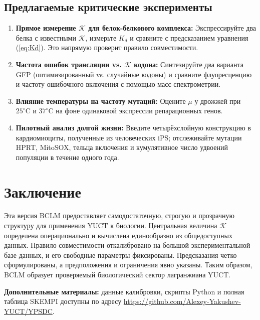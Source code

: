 \documentclass[12pt,a4paper]{article}
\newcommand{\REL}{\mathcal{K}}          %
\begin{document}
	\subsection{Предлагаемые критические эксперименты}
	\begin{enumerate}
		\item \textbf{Прямое измерение \(\REL\) для белок-белкового комплекса:} Экспрессируйте два белка с известными \(\REL\), измерьте \(K_d\) и сравните с предсказанием уравнения (\ref{eq:Kd}). Это напрямую проверит правило совместимости.
		\item \textbf{Частота ошибок трансляции vs. \(\REL\) кодона:} Синтезируйте два варианта GFP (оптимизированный vs. случайные кодоны) и сравните флуоресценцию и частоту ошибочного включения с помощью масс-спектрометрии.
		\item \textbf{Влияние температуры на частоту мутаций:} Оцените \(\mu\) у дрожжей при \(25^\circ\text{C}\) и \(37^\circ\text{C}\) на фоне одинаковой экспрессии репарационных генов.
		\item \textbf{Пилотный анализ долгой жизни:} Введите четырёхслойную конструкцию в кардиомиоциты, полученные из человеческих iPS; отслеживайте мутации HPRT, MitoSOX, тельца включения и кумулятивное число удвоений популяции в течение одного года.
	\end{enumerate}
	
	\section{Заключение}
	Эта версия BCLM предоставляет самодостаточную, строгую и прозрачную структуру для применения YUCT к биологии. Центральная величина \(\REL\) определена операционально и вычислена единообразно из общедоступных данных. Правило совместимости откалибровано на большой экспериментальной базе данных, и его свободные параметры фиксированы. Предсказания четко сформулированы, а предположения и ограничения явно указаны. Таким образом, BCLM образует проверяемый биологический сектор лагранжиана YUCT.
	
	\vspace{0.5cm}
	\noindent\textbf{Дополнительные материалы:} данные калибровки, скрипты Python и полная таблица SKEMPI доступны по адресу \url{https://github.com/Alexey-Yakushev-YUCT/YPSDC}.
	
\end{document}
